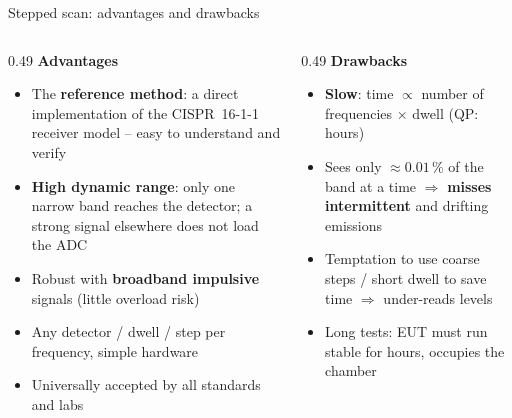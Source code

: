 \documentclass[aspectratio=169]{beamer}
\newcommand{\plus}{\textcolor{okc}{\textbf{+}}}
\newcommand{\minus}{\textcolor{badc}{\textbf{--}}}
\begin{document}
\begin{frame}{Stepped scan: advantages and drawbacks}

\begin{columns}[T]
\begin{column}{0.49\textwidth}
  \textcolor{okc}{\large\textbf{Advantages}}
  \small
  \begin{itemize}
    \item[\plus] The \textbf{reference method}: a direct implementation of the
                 CISPR~16-1-1 receiver model -- easy to understand and verify
    \item[\plus] \textbf{High dynamic range}: only one narrow band reaches the
                 detector; a strong signal elsewhere does not load the ADC
    \item[\plus] Robust with \textbf{broadband impulsive} signals
                 (little overload risk)
    \item[\plus] Any detector / dwell / step per frequency, simple hardware
    \item[\plus] Universally accepted by all standards and labs
  \end{itemize}
\end{column}
\begin{column}{0.49\textwidth}
  \textcolor{badc}{\large\textbf{Drawbacks}}
  \small
  \begin{itemize}
    \item[\minus] \textbf{Slow}: time $\propto$ number of frequencies
                  $\times$ dwell (QP: hours)
    \item[\minus] Sees only $\approx 0.01\,\%$ of the band at a time
                  $\Rightarrow$ \textbf{misses intermittent} and drifting
                  emissions
    \item[\minus] Temptation to use coarse steps / short dwell to save time
                  $\Rightarrow$ under-reads levels
    \item[\minus] Long tests: EUT must run stable for hours, occupies
                  the chamber
  \end{itemize}
\end{column}
\end{columns}

\end{frame}
\end{document}
